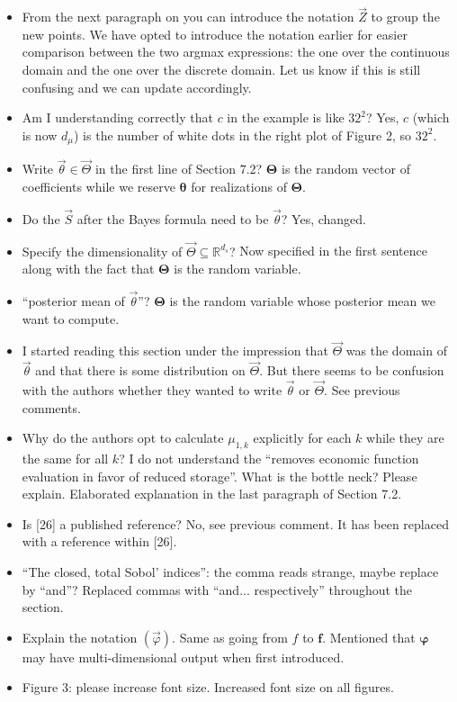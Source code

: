 \documentclass{article}[12pt]
\newcommand{\Referee}[1]{{\color{blue} #1 \newline}}
\begin{document}
\begin{itemize}
    \item \Referee{From the next paragraph on you can introduce the notation $\vec{Z}$ to group the new points.}We have opted to introduce the notation earlier for easier comparison between the two argmax expressions: the one over the continuous domain and the one over the discrete domain. Let us know if this is still confusing and we can update accordingly. 
    \item \Referee{Am I understanding correctly that $c$ in the example is like $32^2$?}Yes, $c$ (which is now $d_\mu$) is the number of white dots in the right plot of Figure 2, so $32^2$.
    \item \Referee{Write $\vec{\theta} \in \vec{\Theta}$ in the first line of Section 7.2?}$\boldsymbol{\Theta}$ is the random vector of coefficients while we reserve $\boldsymbol{\theta}$ for realizations of $\boldsymbol{\Theta}$. 
    \item \Referee{Do the $\vec{S}$ after the Bayes formula need to be $\vec{\theta}$?}Yes, changed. 
    \item \Referee{Specify the dimensionality of $\vec{\Theta} \subseteq \mathbb{R}^{d_s}$?}Now specified in the first sentence along with the fact that $\boldsymbol{\Theta}$ is the random variable.  
    \item \Referee{``posterior mean of $\vec{\theta}$''?}$\boldsymbol{\Theta}$ is the random variable whose posterior mean we want to compute. 
    \item \Referee{I started reading this section under the impression that $\vec{\Theta}$ was the domain of $\vec{\theta}$ and that there is some distribution on $\vec{\Theta}$. But there seems to be confusion with the authors whether they wanted to write $\vec{\theta}$ or $\vec{\Theta}$.}See previous comments. 
    \item \Referee{Why do the authors opt to calculate $\mu_{1,k}$ explicitly for each $k$ while they are the same for all $k$? I do not understand the ``removes economic function evaluation in favor of reduced storage''. What is the bottle neck? Please explain.}Elaborated explanation in the last paragraph of Section 7.2. 
    \item \Referee{Is [26] a published reference?}No, see previous comment. It has been replaced with a reference within [26]. 
    \item \Referee{``The closed, total Sobol' indices'': the comma reads strange, maybe replace by ``and''?}Replaced commas with ``and... respectively'' throughout the section. 
    \item \Referee{Explain the notation $(\vec{\varphi})$.}Same as going from $f$ to $\boldsymbol{f}$. Mentioned that $\boldsymbol{\varphi}$ may have multi-dimensional output when first introduced. 
    \item \Referee{Figure 3: please increase font size.}Increased font size on all figures.
\end{itemize}
\end{document}
